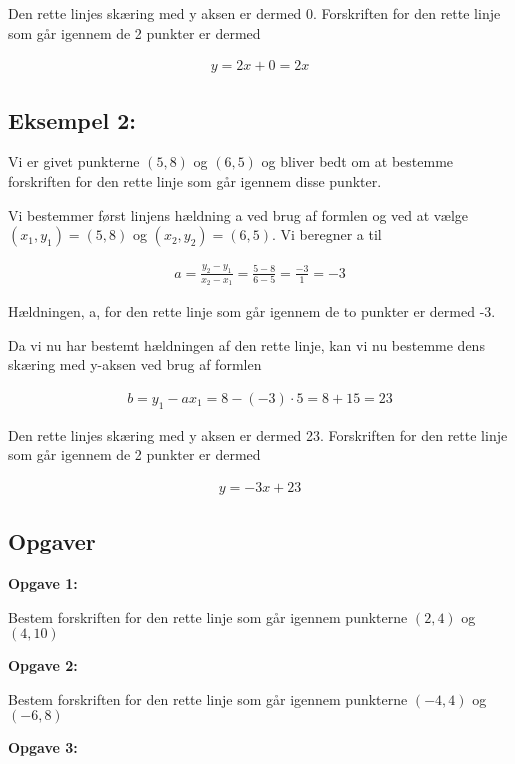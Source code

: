 Den rette linjes skæring med y aksen er dermed 0. Forskriften for den rette linje som går igennem de 2 punkter er dermed

\begin{align*}
y = 2x + 0 = 2x
\end{align*}


\subsection*{Eksempel 2:}

Vi er givet punkterne $(5,8)$ og $(6,5)$ og bliver bedt om at bestemme forskriften for den rette linje som går igennem disse punkter.

Vi bestemmer først linjens hældning a ved brug af formlen og ved at vælge $(x_1, y_1) = (5,8)$ og $(x_2, y_2) = (6,5)$. Vi beregner a til

\begin{align*}
a = \frac{y_2 - y_1}{x_2 - x_1} = \frac{5 - 8}{6 - 5} = \frac{-3}{1} = -3
\end{align*}

Hældningen, a, for den rette linje som går igennem de to punkter er dermed -3. 

Da vi nu har bestemt hældningen af den rette linje, kan vi nu bestemme dens skæring med y-aksen ved brug af formlen

\begin{align*}
b = y_1 - ax_1 = 8 - (-3)\cdot 5 = 8 + 15 = 23
\end{align*}

Den rette linjes skæring med y aksen er dermed 23. Forskriften for den rette linje som går igennem de 2 punkter er dermed

\begin{align*}
y = -3x + 23
\end{align*}



\subsection*{Opgaver}


\textbf{Opgave 1:}

Bestem forskriften for den rette linje som går igennem punkterne $(2 ,4)$ og $(4 ,10)$

\textbf{Opgave 2:}

Bestem forskriften for den rette linje som går igennem punkterne $(-4 ,4)$ og $(-6 ,8)$

\textbf{Opgave 3:}

